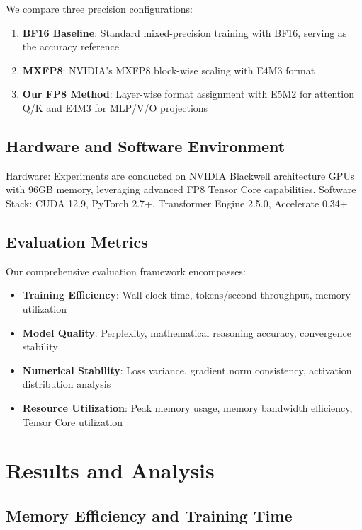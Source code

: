 \documentclass[conference]{IEEEtran}
\begin{document}
We compare three precision configurations:

\begin{enumerate}
\item \textbf{BF16 Baseline}: Standard mixed-precision training with BF16, serving as the accuracy reference
\item \textbf{MXFP8}: NVIDIA's MXFP8 block-wise scaling with E4M3 format
\item \textbf{Our FP8 Method}: Layer-wise format assignment with E5M2 for attention Q/K and E4M3 for MLP/V/O projections
\end{enumerate}

\subsection{Hardware and Software Environment}

Hardware: Experiments are conducted on NVIDIA Blackwell architecture GPUs with 96GB memory, leveraging advanced FP8 Tensor Core capabilities.
Software Stack: CUDA 12.9, PyTorch 2.7+, Transformer Engine 2.5.0, Accelerate 0.34+

\subsection{Evaluation Metrics}

Our comprehensive evaluation framework encompasses:

\begin{itemize}
\item \textbf{Training Efficiency}: Wall-clock time, tokens/second throughput, memory utilization
\item \textbf{Model Quality}: Perplexity, mathematical reasoning accuracy, convergence stability
\item \textbf{Numerical Stability}: Loss variance, gradient norm consistency, activation distribution analysis
\item \textbf{Resource Utilization}: Peak memory usage, memory bandwidth efficiency, Tensor Core utilization
\end{itemize}

\section{Results and Analysis}
\subsection{Memory Efficiency and Training Time}
\end{document}
